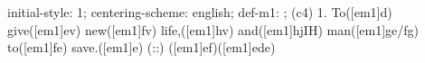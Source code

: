 initial-style: 1;
centering-scheme: english;
def-m1: \grealign;
(c4) 1. To([em1]d) give([em1]ev) new([em1]fv) life,([em1]hv) and([em1]hjIH) man([em1]ge/fg) to([em1]fe) save.([em1]e) (::) ([em1]ef)([em1]ede)